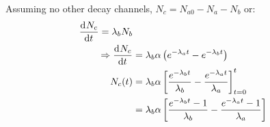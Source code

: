 \begin{parts}
\begin{subparts}
		\subpart Assuming no other decay channels, $N_c = N_{a0} - N_a - N_b$ or:
		\begin{align*}
			\frac{\mathrm{d}^{}{N_c}}{\mathrm{d}{t}^{}} = \lambda_b N_b \\
			\Rightarrow \frac{\mathrm{d}^{}{N_c}}{\mathrm{d}{t}^{}} &= \lambda_b \alpha \left(e^{-\lambda_a t} - e^{-\lambda_b t}\right) \\
			N_c(t) &= \lambda_b \alpha \left[\frac{e^{-\lambda_b t}}{\lambda_b} - \frac{e^{-\lambda_a t}}{\lambda_a}\right]_{t=0}^t \\
			&= \lambda_b \alpha \left[\frac{e^{-\lambda_b t} - 1}{\lambda_b} - \frac{e^{-\lambda_a t} - 1}{\lambda_a}\right]
		\end{align*}
	\end{subparts}
\end{parts}